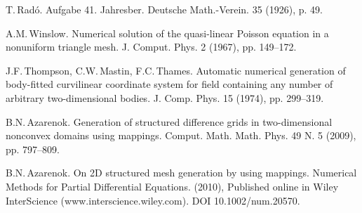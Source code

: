 
\begin{thebibliography}{10}

 {\sc T.\,Rad\'o}. {Aufgabe 41}. Jahresber. Deutsche Math.-Verein. 35 (1926), p. 49.

 {\sc A.M.\,Winslow}. {Numerical solution of the quasi-linear Poisson equation in a nonuniform triangle mesh}. J. Comput. Phys. 2 (1967), pp. 149--172.

 {\sc J.F.\,Thompson, C.W.\,Mastin, F.C.\,Thames}. {Automatic numerical generation of body-fitted curvilinear coordinate system for field containing any
number of arbitrary two-dimensional bodies}. J. Comp. Phys. 15 (1974), pp. 299--319.

 {\sc B.N.\,Azarenok}. {Generation of structured difference grids in two-dimensional nonconvex domains using mappings}. Comput. Math. Math. Phys. 49 N. 5 (2009),
pp. 797--809.

 {\sc B.N.\,Azarenok}. {On 2D structured mesh generation by using mappings}. Numerical Methods for Partial Differential Equations. (2010), Published online in Wiley
InterScience (www.interscience.wiley.com). DOI 10.1002/num.20570.

\end{thebibliography}